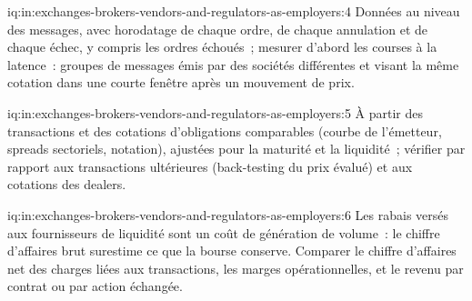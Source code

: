 \begin{solution}{iq:in:exchanges-brokers-vendors-and-regulators-as-employers:4}
Données au niveau des messages, avec horodatage de chaque ordre, de chaque annulation et de chaque échec, y compris les ordres échoués~; mesurer d'abord les courses à la latence~:
groupes de messages émis par des sociétés différentes et visant la même cotation dans une courte fenêtre après un mouvement de prix.
\end{solution}

\begin{solution}{iq:in:exchanges-brokers-vendors-and-regulators-as-employers:5}
À partir des transactions et des cotations d'obligations comparables (courbe de l'émetteur, spreads sectoriels, notation), ajustées pour la maturité et la liquidité~;
vérifier par rapport aux transactions ultérieures (back-testing du prix évalué) et aux cotations des dealers.
\end{solution}

\begin{solution}{iq:in:exchanges-brokers-vendors-and-regulators-as-employers:6}
Les rabais versés aux fournisseurs de liquidité sont un coût de génération de volume~: le chiffre d'affaires brut surestime ce que la bourse conserve.
Comparer le chiffre d'affaires net des charges liées aux transactions, les marges opérationnelles, et le revenu par contrat ou par action échangée.
\end{solution}
